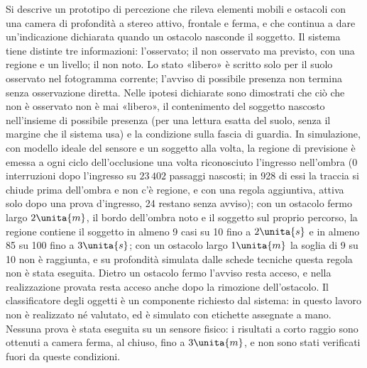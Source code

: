 Si descrive un prototipo di percezione che rileva elementi mobili e ostacoli con una camera di profondità a stereo attivo, frontale e ferma, e che continua a dare un'indicazione dichiarata quando un ostacolo nasconde il soggetto. Il sistema tiene distinte tre informazioni: l'osservato; il non osservato ma previsto, con una regione e un livello; il non noto. Lo stato «libero» è scritto solo per il suolo osservato nel fotogramma corrente; l'avviso di possibile presenza non termina senza osservazione diretta. Nelle ipotesi dichiarate sono dimostrati che ciò che non è osservato non è mai «libero», il contenimento del soggetto nascosto nell'insieme di possibile presenza (per una lettura esatta del suolo, senza il margine che il sistema usa) e la condizione sulla fascia di guardia. In simulazione, con modello ideale del sensore e un soggetto alla volta, la regione di previsione è emessa a ogni ciclo dell'occlusione una volta riconosciuto l'ingresso nell'ombra (0 interruzioni dopo l'ingresso su $23\,402$ passaggi nascosti; in 928 di essi la traccia si chiude prima dell'ombra e non c'è regione, e con una regola aggiuntiva, attiva solo dopo una prova d'ingresso, 24 restano senza avviso); con un ostacolo fermo largo $2\unita{m}$, il bordo dell'ombra noto e il soggetto sul proprio percorso, la regione contiene il soggetto in almeno 9 casi su 10 fino a $2\unita{s}$ e in almeno 85 su 100 fino a $3\unita{s}$; con un ostacolo largo $1\unita{m}$ la soglia di 9 su 10 non è raggiunta, e su profondità simulata dalle schede tecniche questa regola non è stata eseguita. Dietro un ostacolo fermo l'avviso resta acceso, e nella realizzazione provata resta acceso anche dopo la rimozione dell'ostacolo. Il classificatore degli oggetti è un componente richiesto dal sistema: in questo lavoro non è realizzato né valutato, ed è simulato con etichette assegnate a mano. Nessuna prova è stata eseguita su un sensore fisico: i risultati a corto raggio sono ottenuti a camera ferma, al chiuso, fino a $3\unita{m}$, e non sono stati verificati fuori da queste condizioni.

